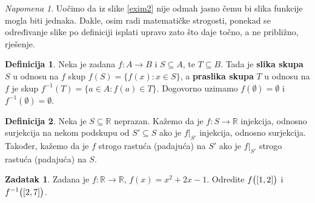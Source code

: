 \documentclass{book}
\let\originalleft\left
\let\originalright\right
\renewcommand{\left}{\mathopen{}\mathclose\bgroup\originalleft}
\renewcommand{\right}{\aftergroup\egroup\originalright}
\theoremstyle{definition}
\theoremstyle{definition}
\newtheorem{definition}{Definicija}
\newtheorem{exercise}{Zadatak}
\theoremstyle{remark}
\newtheorem{remark}{Napomena}
\begin{document}
\begin{remark}
Uočimo da iz slike \ref{exim2} nije odmah jasno čemu bi slika funkcije mogla biti jednaka. Dakle, osim radi matematičke strogosti, ponekad se određivanje slike po definiciji isplati upravo zato što daje točno, a ne približno, rješenje.
\end{remark}
\newpage
\begin{definition}
Neka je zadana $f : A\to B$ i $S\subseteq A$, te $T\subseteq B$. Tada je \textbf{slika skupa} $S$ u odnosu na $f$ skup $f(S)=\{f(x) : x\in S\}$, a \textbf{praslika skupa} $T$ u odnosu na $f$ je skup $f^{-1}(T)=\{a\in A : f(a)\in T\}$. Dogovorno uzimamo $f(\emptyset)=\emptyset$ i $f^{-1}(\emptyset)=\emptyset$.
\end{definition}
\begin{definition}
Neka je $S\subseteq \mathbb{R}$ neprazan. Kažemo da je $f : S\to \mathbb{R}$ injekcija, odnosno surjekcija na nekom podskupu od $S'\subseteq S$ ako je $f|_{S'}$ injekcija, odnosno surjekcija. Također, kažemo da je $f$ strogo rastuća (padajuća) na $S'$ ako je $f|_{S'}$ strogo rastuća (padajuća) na $S$.
\end{definition}
\begin{exercise}
Zadana je $f : \mathbb{R}\to \mathbb{R}$, $f(x)=x^2+2x-1$. Odredite $f\left(\left[1, 2\right]\right)$ i $f^{-1}\left(\left[2, 7\right]\right)$.
\end{exercise}
\end{document}
